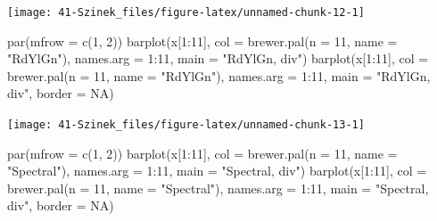 \documentclass[
]{book}
\newenvironment{Shaded}{\begin{snugshade}}{\end{snugshade}}
\newcommand{\AttributeTok}[1]{\textcolor[rgb]{0.77,0.63,0.00}{#1}}
\newcommand{\ConstantTok}[1]{\textcolor[rgb]{0.00,0.00,0.00}{#1}}
\newcommand{\DecValTok}[1]{\textcolor[rgb]{0.00,0.00,0.81}{#1}}
\newcommand{\FunctionTok}[1]{\textcolor[rgb]{0.00,0.00,0.00}{#1}}
\newcommand{\NormalTok}[1]{#1}
\newcommand{\SpecialCharTok}[1]{\textcolor[rgb]{0.00,0.00,0.00}{#1}}
\newcommand{\StringTok}[1]{\textcolor[rgb]{0.31,0.60,0.02}{#1}}
\begin{document}
\begin{center}\texttt{[image: 41-Szinek\_files/figure-latex/unnamed-chunk-12-1]} \end{center}

\begin{Shaded}
\begin{Highlighting}[]
\FunctionTok{par}\NormalTok{(}\AttributeTok{mfrow =} \FunctionTok{c}\NormalTok{(}\DecValTok{1}\NormalTok{, }\DecValTok{2}\NormalTok{))}
\FunctionTok{barplot}\NormalTok{(x[}\DecValTok{1}\SpecialCharTok{:}\DecValTok{11}\NormalTok{], }\AttributeTok{col =} \FunctionTok{brewer.pal}\NormalTok{(}\AttributeTok{n =} \DecValTok{11}\NormalTok{, }\AttributeTok{name =} \StringTok{"RdYlGn"}\NormalTok{), }\AttributeTok{names.arg =} \DecValTok{1}\SpecialCharTok{:}\DecValTok{11}\NormalTok{, }
    \AttributeTok{main =} \StringTok{"RdYlGn, div"}\NormalTok{)}
\FunctionTok{barplot}\NormalTok{(x[}\DecValTok{1}\SpecialCharTok{:}\DecValTok{11}\NormalTok{], }\AttributeTok{col =} \FunctionTok{brewer.pal}\NormalTok{(}\AttributeTok{n =} \DecValTok{11}\NormalTok{, }\AttributeTok{name =} \StringTok{"RdYlGn"}\NormalTok{), }\AttributeTok{names.arg =} \DecValTok{1}\SpecialCharTok{:}\DecValTok{11}\NormalTok{, }
    \AttributeTok{main =} \StringTok{"RdYlGn, div"}\NormalTok{, }\AttributeTok{border =} \ConstantTok{NA}\NormalTok{)}
\end{Highlighting}
\end{Shaded}

\begin{center}\texttt{[image: 41-Szinek\_files/figure-latex/unnamed-chunk-13-1]} \end{center}

\begin{Shaded}
\begin{Highlighting}[]
\FunctionTok{par}\NormalTok{(}\AttributeTok{mfrow =} \FunctionTok{c}\NormalTok{(}\DecValTok{1}\NormalTok{, }\DecValTok{2}\NormalTok{))}
\FunctionTok{barplot}\NormalTok{(x[}\DecValTok{1}\SpecialCharTok{:}\DecValTok{11}\NormalTok{], }\AttributeTok{col =} \FunctionTok{brewer.pal}\NormalTok{(}\AttributeTok{n =} \DecValTok{11}\NormalTok{, }\AttributeTok{name =} \StringTok{"Spectral"}\NormalTok{), }\AttributeTok{names.arg =} \DecValTok{1}\SpecialCharTok{:}\DecValTok{11}\NormalTok{, }
    \AttributeTok{main =} \StringTok{"Spectral, div"}\NormalTok{)}
\FunctionTok{barplot}\NormalTok{(x[}\DecValTok{1}\SpecialCharTok{:}\DecValTok{11}\NormalTok{], }\AttributeTok{col =} \FunctionTok{brewer.pal}\NormalTok{(}\AttributeTok{n =} \DecValTok{11}\NormalTok{, }\AttributeTok{name =} \StringTok{"Spectral"}\NormalTok{), }\AttributeTok{names.arg =} \DecValTok{1}\SpecialCharTok{:}\DecValTok{11}\NormalTok{, }
    \AttributeTok{main =} \StringTok{"Spectral, div"}\NormalTok{, }\AttributeTok{border =} \ConstantTok{NA}\NormalTok{)}
\end{Highlighting}
\end{Shaded}
\end{document}
